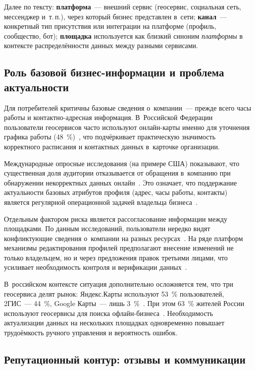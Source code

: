 Далее по тексту: \textbf{платформа}~--- внешний сервис (геосервис, социальная сеть, мессенджер и~т.\,п.), через который бизнес представлен в~сети; \textbf{канал}~--- конкретный тип присутствия или интеграции на платформе (профиль, сообщество, бот); \textbf{площадка} используется как близкий синоним \textit{платформы} в контексте распределённости данных между разными сервисами.

\subsection{Роль базовой бизнес-информации и проблема актуальности}
\label{subsec:business-info}

Для потребителей критичны базовые сведения о~компании~--- прежде всего часы работы и контактно-адресная информация. В~Российской Федерации пользователи геосервисов часто используют онлайн-карты именно для уточнения графика работы (48~\%)~\cite{src:35}, что подчёркивает практическую значимость корректного расписания и контактных данных в~карточке организации.

Международные опросные исследования (на примере США) показывают, что существенная доля аудитории отказывается от обращения в~компанию при обнаружении некорректных данных онлайн~\cite{src:1, src:3}. Это означает, что поддержание актуальности базовых атрибутов профиля (адрес, часы работы, контакты) является регулярной операционной задачей владельца бизнеса~\cite{src:4}.

Отдельным фактором риска является рассогласование информации между площадками. По данным исследований, пользователи нередко видят конфликтующие сведения о~компании на разных ресурсах~\cite{src:3}. На ряде платформ механизмы редактирования профилей предполагают внесение изменений не только владельцем, но и через предложения правок третьими лицами, что усиливает необходимость контроля и верификации данных~\cite{src:4}.

В~российском контексте ситуация дополнительно осложняется тем, что три геосервиса делят рынок: Яндекс.Карты используют 53~\% пользователей, 2ГИС~--- 44~\%, Google Карты~--- лишь 3~\%~\cite{src:35}. При этом 63~\% жителей России используют геосервисы для поиска офлайн-бизнеса~\cite{src:35}. Необходимость актуализации данных на нескольких площадках одновременно повышает трудоёмкость ручного управления и вероятность ошибок.

\subsection{Репутационный контур: отзывы и коммуникации}
\label{subsec:reputation}

